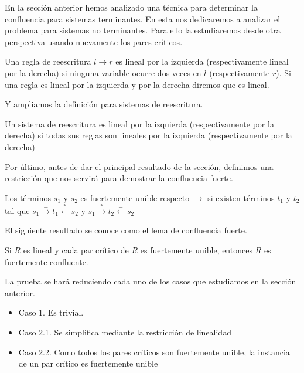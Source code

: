 En la sección anterior hemos analizado una técnica para determinar la
confluencia para sistemas terminantes. En esta nos dedicaremos a
analizar el problema para sistemas no terminantes. Para ello la
estudiaremos desde otra perspectiva usando nuevamente los pares
críticos.

\begin{defi}
  Una regla de reescritura $l \rightarrow r$ es lineal por la
  izquierda (respectivamente lineal por la derecha) si ninguna
  variable ocurre dos veces en $l$ (respectivamente $r$). Si una regla
  es lineal por la izquierda y por la derecha diremos que es lineal. 
\end{defi}

Y ampliamos la definición para sistemas de reescritura.

\begin{defi}
  Un sistema de reescritura es lineal por la izquierda
  (respectivamente por la derecha) si todas sus reglas son lineales por
  la izquierda (respectivamente por la derecha)
\end{defi}

Por último, antes de dar el principal resultado de la sección,
definimos una restricción que nos servirá para demostrar la
confluencia fuerte.

\begin{defi}
  Los términos $s_1$ y $s_2$ es fuertemente unible respecto
  $\rightarrow$ si existen términos $t_1$ y $t_2$ tal que
  $s_1 \xrightarrow{=} t_1 \xleftarrow{*} s_2$ y $s_1 \xrightarrow{*}
  t_2 \xleftarrow{=} s_2$
\end{defi}


El siguiente resultado se conoce como el lema de confluencia fuerte.

\begin{defi}
  Si $R$ es lineal y cada par crítico de $R$ es fuertemente unible,
  entonces $R$ es fuertemente confluente.
\end{defi}

\begin{demo}
  La prueba se hará reduciendo cada uno de los casos que estudiamos en
  la sección anterior.
  
  \begin{itemize}
    
  \item Caso 1. Es trivial.

  \item Caso 2.1. Se simplifica mediante la restricción de linealidad

  \item Caso 2.2. Como todos los pares críticos son fuertemente
    unible, la instancia de un par crítico es fuertemente unible

  \end{itemize}

\end{demo}

